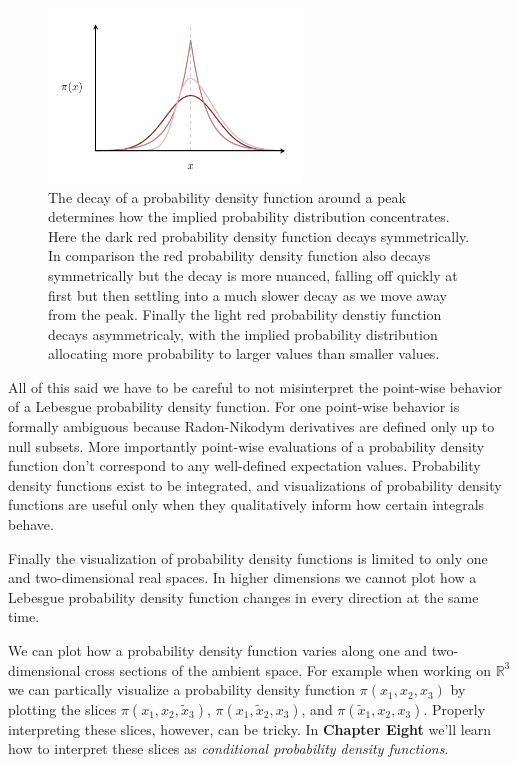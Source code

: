 \documentclass[
  letterpaper,
  DIV=11,
  numbers=noendperiod]{scrartcl}
\begin{document}
\begin{figure}

{\centering \includegraphics[width=0.6\textwidth,height=\textheight]{figures/varying_shapes/varying_shapes.pdf}

}

\caption{\label{fig-varying-shapes}The decay of a probability density
function around a peak determines how the implied probability
distribution concentrates. Here the dark red probability density
function decays symmetrically. In comparison the red probability density
function also decays symmetrically but the decay is more nuanced,
falling off quickly at first but then settling into a much slower decay
as we move away from the peak. Finally the light red probability denstiy
function decays asymmetricaly, with the implied probability distribution
allocating more probability to larger values than smaller values.}

\end{figure}

All of this said we have to be careful to not misinterpret the
point-wise behavior of a Lebesgue probability density function. For one
point-wise behavior is formally ambiguous because Radon-Nikodym
derivatives are defined only up to null subsets. More importantly
point-wise evaluations of a probability density function don't
correspond to any well-defined expectation values. Probability density
functions exist to be integrated, and visualizations of probability
density functions are useful only when they qualitatively inform how
certain integrals behave.

Finally the visualization of probability density functions is limited to
only one and two-dimensional real spaces. In higher dimensions we cannot
plot how a Lebesgue probability density function changes in every
direction at the same time.

We can plot how a probability density function varies along one and
two-dimensional cross sections of the ambient space. For example when
working on \(\mathbb{R}^{3}\) we can partically visualize a probability
density function \(\pi(x_{1}, x_{2}, x_{3})\) by plotting the slices
\(\pi(x_{1}, x_{2}, \tilde{x}_{3})\),
\(\pi(x_{1}, \tilde{x}_{2}, x_{3})\), and
\(\pi(\tilde{x}_{1}, x_{2}, x_{3})\). Properly interpreting these
slices, however, can be tricky. In \textbf{Chapter Eight} we'll learn
how to interpret these slices as \emph{conditional probability density
functions}.
\end{document}
